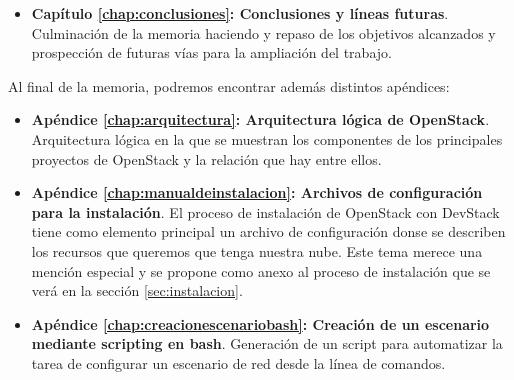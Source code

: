 \begin{itemize}
\item \textbf{Capítulo \ref{chap:conclusiones}: Conclusiones y líneas futuras}. Culminación de la memoria haciendo y repaso de los objetivos alcanzados y prospección de futuras vías para la ampliación del trabajo.
\end{itemize}

Al final de la memoria, podremos encontrar además distintos apéndices:

\begin{itemize}
\item \textbf{Apéndice \ref{chap:arquitectura}: Arquitectura lógica de OpenStack}. Arquitectura lógica en la que se muestran los componentes de los principales proyectos de OpenStack y la relación que hay entre ellos.
\end{itemize}

\begin{itemize}
\item \textbf{Apéndice \ref{chap:manualdeinstalacion}: Archivos de configuración para la instalación}. El proceso de instalación de OpenStack con DevStack tiene como elemento principal un archivo de configuración donse se describen los recursos que queremos que tenga nuestra nube. Este tema merece una mención especial y se propone como anexo al proceso de instalación que se verá en la sección \ref{sec:instalacion}.
\end{itemize}

\begin{itemize}
\item \textbf{Apéndice \ref{chap:creacionescenariobash}: Creación de un escenario mediante scripting en bash}. Generación de un script para automatizar la tarea de configurar un escenario de red desde la línea de comandos.
\end{itemize}






